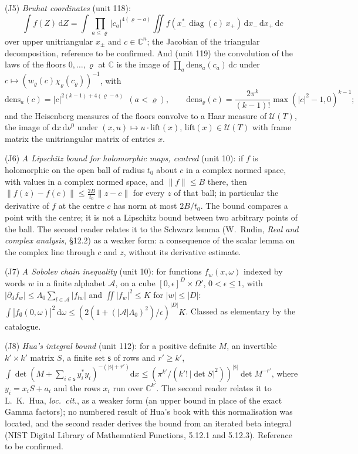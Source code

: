 \documentclass[11pt,a4paper]{article}
\theoremstyle{plainx}
\theoremstyle{uprightx}
\newcommand{\CC}{\mathbb{C}}
\newcommand{\dd}{\mathrm{d}}
\newcommand{\UT}[1]{\mathcal{U}(#1)}
\newcommand{\wl}[2]{w_{#1}(#2)}
\newcommand{\boost}[2]{\chi_{#1}(#2)}
\newcommand{\Inp}[1]{\textup{(#1)}}
\newcommand{\muz}{\nu^{0}}
\begin{document}
\Inp{J5} \emph{Bruhat coordinates} (unit 118):
\[\int f(Z)\,\dd Z=\int\prod_{a\le\varrho}|c_a|^{4(\varrho-a)}\iint f(x_-^{*}\operatorname{diag}(c)\,x_+)\,\dd x_-\,\dd x_+\,\dd c\]
over upper unitriangular $x_\pm$ and $c\in\CC^{n}$; the Jacobian of the triangular decomposition, reference to be
confirmed. And (unit 119) the convolution of the laws of the floors $0,\dots,\varrho$ at $\CC$ is the image of
$\prod_a\mathrm{dens}_a(c_a)\,\dd c$ under $c\mapsto(\wl{\varrho}{c}\boost{\varrho}{c_\varrho})^{-1}$, with
\[\mathrm{dens}_a(c)=|c|^{2(k-1)+4(\varrho-a)}\ \ (a<\varrho),\qquad
\mathrm{dens}_\varrho(c)=\frac{2\pi^{k}}{(k-1)!}\max(|c|^2-1,0)^{k-1};\]
and the Heisenberg measures of the floors
convolve to a Haar measure of $\UT{T}$, the image of $\dd x\,\dd\muz$ under $(x,u)\mapsto u\cdot\mathrm{lift}(x)$,
$\mathrm{lift}(x)\in\UT{T}$ with frame matrix the unitriangular matrix of entries $x$.

\Inp{J6} \emph{A Lipschitz bound for holomorphic maps, centred} (unit 10): if $f$ is holomorphic on the open ball of
radius $t_0$ about $c$ in a complex normed space, with values in a complex normed space, and $\|f\|\le B$ there, then
$\|f(z)-f(c)\|\le\frac{2B}{t_0}\|z-c\|$ for every $z$ of that ball; in particular the derivative of $f$ at the
centre $c$ has norm at most $2B/t_0$. The bound compares a point with the centre; it is not a Lipschitz bound
between two arbitrary points of the ball. The second reader relates it to the Schwarz lemma (W.~Rudin, \emph{Real and
complex analysis}, \S12.2) as a weaker form: a consequence of the scalar lemma on the complex line through $c$ and
$z$, without its derivative estimate.

\Inp{J7} \emph{A Sobolev chain inequality} (unit 10): for functions $f_w(x,\omega)$ indexed by words $w$ in a finite
alphabet $\mathcal{A}$, on a cube $[0,\epsilon]^{D}\times\Omega'$, $0<\epsilon\le1$, with
$|\partial_df_w|\le\Lambda_0\sum_{l\in\mathcal{A}}|f_{lw}|$ and $\iint|f_w|^2\le K$ for $|w|\le|D|$:
$\int|f_\emptyset(0,\omega)|^2\,\dd\omega\le(2(1+(|\mathcal{A}|\Lambda_0)^2)/\epsilon)^{|D|}K$. Classed as elementary
by the catalogue.

\Inp{J8} \emph{Hua's integral bound} (unit 112): for a positive definite $M$, an invertible $k'\times k'$ matrix
$S$, a finite set $\mathsf{s}$ of rows and $r'\ge k'$,
$\int\det(M+\sum_{i\in\mathsf{s}}y_i^{*}y_i)^{-(|\mathsf{s}|+r')}\dd x\le(\pi^{k'}/(k'!\,|\det S|^2))^{|\mathsf{s}|}\det M^{-r'}$,
where $y_i=x_iS+a_i$ and the rows $x_i$ run over $\CC^{k'}$. The second reader relates it to L.~K.~Hua, \emph{loc.\
cit.}, as a weaker form (an upper bound in place of the exact Gamma factors); no numbered result of Hua's book
with this normalisation was located, and the second reader derives the bound from an iterated beta integral (NIST
Digital Library of Mathematical Functions, 5.12.1 and 5.12.3). Reference to be confirmed.
\end{document}
